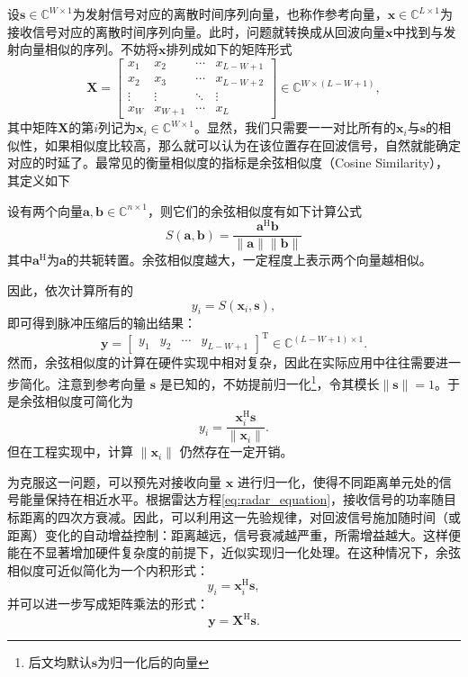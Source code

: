 设\( \bm{s} \in \mathbb{C}^{W \times 1} \)为发射信号对应的离散时间序列向量，也称作参考向量，\( \bm{x} \in \mathbb{C}^{L \times 1} \)为接收信号对应的离散时间序列向量。此时，问题就转换成从回波向量\( \bm{x} \)中找到与发射向量相似的序列。不妨将\( \bm{x} \)排列成如下的矩阵形式
\[
    \mathbf{X} = \begin{bmatrix}
        x_1    & x_2     & \cdots & x_{L-W+1} \\
        x_2    & x_3     & \cdots & x_{L-W+2} \\
        \vdots & \vdots  & \ddots & \vdots    \\
        x_W    & x_{W+1} & \cdots & x_L
    \end{bmatrix} \in \mathbb{C}^{W \times (L-W+1)},
\]
其中矩阵\( \mathbf{X} \)的第\( i \)列记为\( \bm{x}_i \in \mathbb{C}^{W \times 1} \)。显然，我们只需要一一对比所有的\( \bm{x}_i \)与\( \bm{s} \)的相似性，如果相似度比较高，那么就可以认为在该位置存在回波信号，自然就能确定对应的时延了。最常见的衡量相似度的指标是余弦相似度（Cosine Similarity），其定义如下
\begin{definition}
    设有两个向量\( \bm{a}, \bm{b} \in \mathbb{C}^{n \times 1} \)，则它们的余弦相似度有如下计算公式
    \[
        S(\bm{a}, \bm{b}) = \frac{\bm{a}^{\mathrm{H}} \bm{b}}{\|\bm{a}\| \|\bm{b}\|}
    \]
    其中\( \bm{a}^{\mathrm{H}} \)为\( \bm{a} \)的共轭转置。余弦相似度越大，一定程度上表示两个向量越相似。
\end{definition}

因此，依次计算所有的
\[
    y_i = S(\bm{x}_i, \bm{s}),
\]
即可得到脉冲压缩后的输出结果：
\[
    \bm{y} = \begin{bmatrix} y_1 & y_2 & \cdots & y_{L-W+1} \end{bmatrix}^{\mathrm{T}}
    \in \mathbb{C}^{(L-W+1) \times 1}.
\]
然而，余弦相似度的计算在硬件实现中相对复杂，因此在实际应用中往往需要进一步简化。注意到参考向量 \( \bm{s} \) 是已知的，不妨提前归一化\footnote{后文均默认\( \bm{s} \)为归一化后的向量}，令其模长\( \left\| \bm{s} \right\| = 1 \)。于是余弦相似度可简化为
\[
    y_i = \frac{\bm{x}_i^{\mathrm{H}} \bm{s}}{\|\bm{x}_i\|}.
\]
但在工程实现中，计算 \( \|\bm{x}_i\| \) 仍然存在一定开销。

为克服这一问题，可以预先对接收向量 \( \bm{x} \) 进行归一化，使得不同距离单元处的信号能量保持在相近水平。根据雷达方程\cref{eq:radar_equation}，接收信号的功率随目标距离的四次方衰减。因此，可以利用这一先验规律，对回波信号施加随时间（或距离）变化的自动增益控制：距离越远，信号衰减越严重，所需增益越大。这样便能在不显著增加硬件复杂度的前提下，近似实现归一化处理。在这种情况下，余弦相似度可近似简化为一个内积形式：
\[
    y_i =  \bm{x}_i^{\mathrm{H}} \bm{s},
\]
并可以进一步写成矩阵乘法的形式：
\[
    \bm{y} = \mathbf{X}^{\mathrm{H}} \bm{s}.
\]

